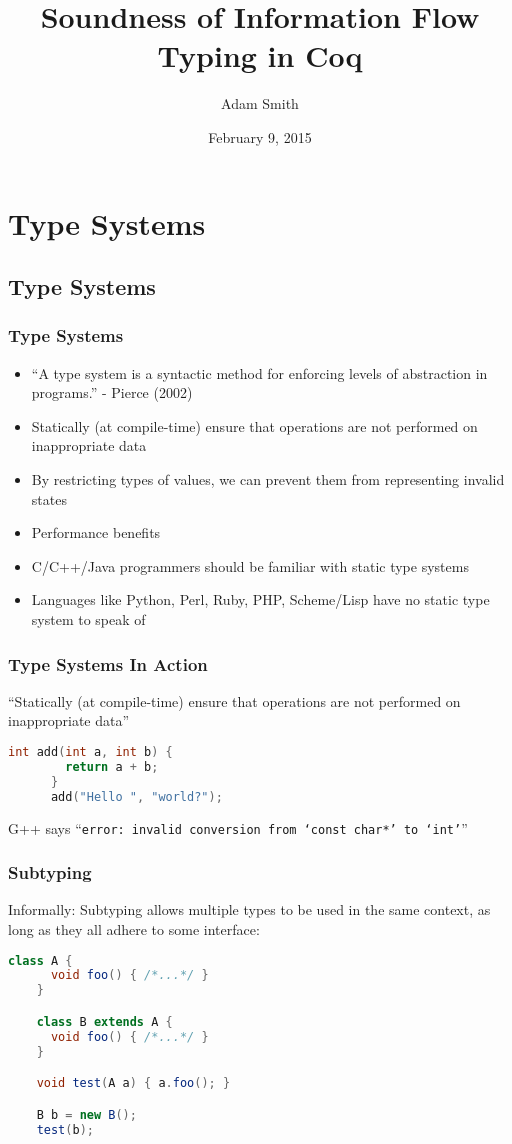 \documentclass{beamer}
\title{Soundness of Information Flow Typing in Coq}
\author{Adam Smith}
\date{February 9, 2015}
\begin{document}
  \frame{\titlepage}
  \section{Type Systems}
  \subsection{Type Systems}
  \begin{frame}
    \frametitle{Type Systems}
    \begin{itemize}
      \item ``A type system is a syntactic method for enforcing levels of
             abstraction in programs.'' - Pierce (2002)
      \pause
      \item Statically (at compile-time) ensure that operations are not
            performed on inappropriate data
      \pause
      \item By restricting types of values, we can prevent them from
            representing invalid states
      \pause
      \item Performance benefits
      \pause
      \item C/C++/Java programmers should be familiar with static type systems
      \pause
      \item Languages like Python, Perl, Ruby, PHP, Scheme/Lisp have no static
            type system to speak of
    \end{itemize}
  \end{frame}
\begin{frame}[fragile]
    \frametitle{Type Systems In Action}
    ``Statically (at compile-time) ensure that operations are not performed
      on inappropriate data''
    \begin{lstlisting}[language=C,
                       captionpos=b,
                       caption=A C program with a type error]
      int add(int a, int b) {
        return a + b;
      }
      add("Hello ", "world?");
    \end{lstlisting}
    \pause
    G++ says ``\texttt{error: invalid conversion from `const char*' to `int'}''
\end{frame}
\begin{frame}[fragile]
  \frametitle{Subtyping}
  Informally: Subtyping allows multiple types to be used in the same context,
  as long as they all adhere to some interface:
  \begin{lstlisting}[language=Java,
                     captionpos=b,
                     caption=Subtyping in the Java programming language]
    class A {
      void foo() { /*...*/ }
    }

    class B extends A {
      void foo() { /*...*/ }
    }

    void test(A a) { a.foo(); }

    B b = new B();
    test(b);
  \end{lstlisting}
\end{frame}
\end{document}
